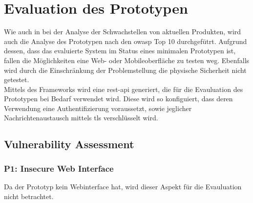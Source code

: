 \section{Evaluation des Prototypen}
\label{sec:evaluation}
    Wie auch in  bei der Analyse der Schwachstellen von aktuellen Produkten, wird auch die Analyse des Prototypen nach den \gls{owasp} Top 10\cite{Miessler} durchgefütrt. 
    Aufgrund dessen, dass das evaluierte System im Status eines minimalen Prototypen ist, fallen die Möglichkeiten eine Web- oder Mobileoberfläche zu testen weg. 
    Ebenfalls wird durch die Einschränkung der Problemstellung die physische Sicherheit nicht getestet.
    \medskip\\
    Mittels des Frameworks wird eine \gls{rest}-\gls{api} generiert, die für die Evauluation des Prototypen bei Bedarf verwendet wird. 
    Diese wird so konfiguiert, dass deren Verwendung eine Authentifizierung voraussetzt, sowie jeglicher Nachrichtenaustausch mittels \gls{tls} verschlüsselt wird.

    \subsection{Vulnerability Assessment}
        \subsubsection*{P1: Insecure Web Interface}
            Da der Prototyp kein Webinterface hat, wird dieser Aspekt für die Evauluation nicht betrachtet.
           
